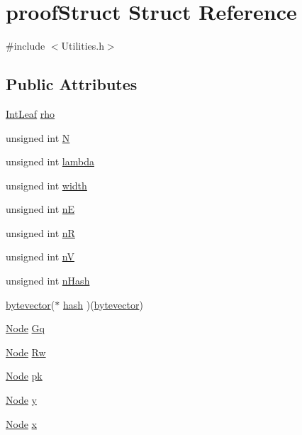 \hypertarget{structproof_struct}{\section{proof\-Struct Struct Reference}
\label{structproof_struct}
}


{\ttfamily \#include $<$Utilities.\-h$>$}

\subsection*{Public Attributes}
\begin{DoxyCompactItemize}
\item 
\hyperlink{class_int_leaf}{Int\-Leaf} \hyperlink{structproof_struct_ab1999478bdd29b12182e779ca87c5688}{rho}
\item 
unsigned int \hyperlink{structproof_struct_a0cc71ed82e9ffb36d65d14f9175c410e}{N}
\item 
unsigned int \hyperlink{structproof_struct_a2d90dfe6612e6c274c4a4a10dce67a09}{lambda}
\item 
unsigned int \hyperlink{structproof_struct_a36aaf46a8b958a4eabc208bcab7ebe39}{width}
\item 
unsigned int \hyperlink{structproof_struct_aabd2af2f6cf0f54be5760db951f3a659}{n\-E}
\item 
unsigned int \hyperlink{structproof_struct_a4feb1dac14ce3391235b290ef0bd084c}{n\-R}
\item 
unsigned int \hyperlink{structproof_struct_ab6da9a1ea198d843e3110d64c6076d7a}{n\-V}
\item 
unsigned int \hyperlink{structproof_struct_a89641c590d5a91c3dee3f654762ceeed}{n\-Hash}
\item 
\hyperlink{types_8h_a64b5be62be31dcda165d2c6c3c262fb5}{bytevector}($\ast$ \hyperlink{structproof_struct_ade50f97f28e5f001864a1c69a39e50f7}{hash} )(\hyperlink{types_8h_a64b5be62be31dcda165d2c6c3c262fb5}{bytevector})
\item 
\hyperlink{class_node}{Node} \hyperlink{structproof_struct_a0f454b14b6f3f83305384a6e989b74e0}{Gq}
\item 
\hyperlink{class_node}{Node} \hyperlink{structproof_struct_ab830ed3c916a0d10db146ee28f036027}{Rw}
\item 
\hyperlink{class_node}{Node} \hyperlink{structproof_struct_ab3aee6b90a2d2d14f59ab5b6ebcd441d}{pk}
\item 
\hyperlink{class_node}{Node} \hyperlink{structproof_struct_a9244ef329dccb2486cf1e495a2ea750a}{y}
\item 
\hyperlink{class_node}{Node} \hyperlink{structproof_struct_a6a2f1e91ede3cd60e65135b96873ba0b}{x}
\end{DoxyCompactItemize}


